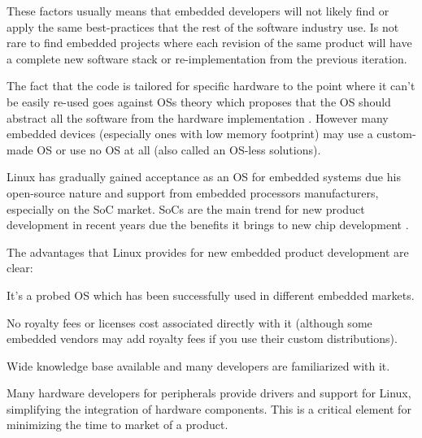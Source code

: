 These factors usually means that embedded developers will not likely find or apply the same best-practices that the rest of the software industry use. Is not rare to find embedded projects where each revision of the same product will have a complete new software stack or re-implementation from the previous iteration.

The fact that the code is tailored for specific hardware to the point where it can't be easily re-used goes against \acp{OS} theory which proposes that the \ac{OS} should abstract all the software from the hardware implementation \citep[p.~29]{Silberschatz:2010vn}. However many embedded devices (especially ones with low memory footprint) may use a custom-made \ac{OS} or use no \ac{OS} at all (also called an \ac{OS}-less solutions).

Linux has gradually gained acceptance as an \ac{OS} for embedded systems due his open-source nature and support from embedded processors manufacturers, especially on the \ac{SoC} market. \acp{SoC} are the main trend for new product development in recent years due the benefits it brings to new chip development \citep{Somaya:2000fk}.

The advantages that Linux provides for new embedded product development are clear:
\begin{itemize*}
\item It's a probed \ac{OS} which has been successfully used in different embedded markets.
\item No royalty fees or licenses cost associated directly with it (although some embedded vendors may add royalty fees if you use their custom distributions).
\item Wide knowledge base available and many developers are familiarized with it.
\item Many hardware developers for peripherals provide drivers and support for Linux, simplifying the integration of hardware components. This is a critical element for minimizing the time to market of a product.
\end{itemize*}

